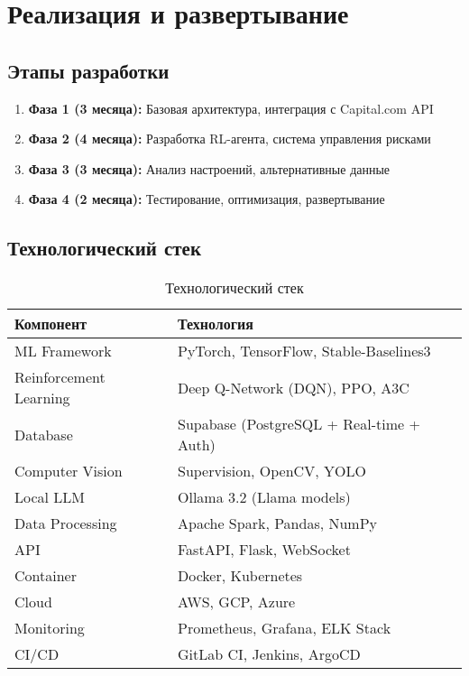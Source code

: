 \documentclass[12pt,a4paper]{article}
\begin{document}
\section{Реализация и развертывание}

\subsection{Этапы разработки}
\begin{enumerate}
    \item \textbf{Фаза 1 (3 месяца):} Базовая архитектура, интеграция с Capital.com API
    \item \textbf{Фаза 2 (4 месяца):} Разработка RL-агента, система управления рисками
    \item \textbf{Фаза 3 (3 месяца):} Анализ настроений, альтернативные данные
    \item \textbf{Фаза 4 (2 месяца):} Тестирование, оптимизация, развертывание
\end{enumerate}

\subsection{Технологический стек}
\begin{table}[H]
\centering
\caption{Технологический стек}
\begin{tabular}{@{}ll@{}}
\toprule
\textbf{Компонент} & \textbf{Технология} \\ \midrule
ML Framework & PyTorch, TensorFlow, Stable-Baselines3 \\
Reinforcement Learning & Deep Q-Network (DQN), PPO, A3C \\
Database & Supabase (PostgreSQL + Real-time + Auth) \\
Computer Vision & Supervision, OpenCV, YOLO \\
Local LLM & Ollama 3.2 (Llama models) \\
Data Processing & Apache Spark, Pandas, NumPy \\
API & FastAPI, Flask, WebSocket \\
Container & Docker, Kubernetes \\
Cloud & AWS, GCP, Azure \\
Monitoring & Prometheus, Grafana, ELK Stack \\
CI/CD & GitLab CI, Jenkins, ArgoCD \\
\bottomrule
\end{tabular}
\end{table}
\end{document}
